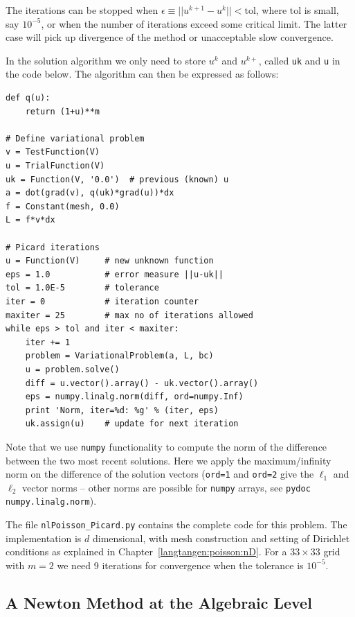 The iterations can be stopped when $\epsilon\equiv ||u^{k+1}-u^k||
< \mbox{tol}$, where $\mbox{tol}$ is small, say $10^{-5}$, or
when the number of iterations exceed some critical limit. The latter
case will pick up divergence of the method or unacceptable slow
convergence.

In the solution algorithm we only need to store $u^k$ and $u^{k+}$,
called {\fontsize{12pt}{12pt}\texttt{uk}} and {\fontsize{12pt}{12pt}\texttt{u}} in the code below.
The algorithm can then be expressed as follows:
\begin{Verbatim}[fontsize=\fontsize{10pt}{10pt},tabsize=8,baselinestretch=1.05,
fontfamily=tt,xleftmargin=7mm]
def q(u):
    return (1+u)**m

# Define variational problem
v = TestFunction(V)
u = TrialFunction(V)
uk = Function(V, '0.0')  # previous (known) u
a = dot(grad(v), q(uk)*grad(u))*dx
f = Constant(mesh, 0.0)
L = f*v*dx

# Picard iterations
u = Function(V)     # new unknown function
eps = 1.0           # error measure ||u-uk||
tol = 1.0E-5        # tolerance
iter = 0            # iteration counter
maxiter = 25        # max no of iterations allowed
while eps > tol and iter < maxiter:
    iter += 1
    problem = VariationalProblem(a, L, bc)
    u = problem.solve()
    diff = u.vector().array() - uk.vector().array()
    eps = numpy.linalg.norm(diff, ord=numpy.Inf)
    print 'Norm, iter=%d: %g' % (iter, eps)
    uk.assign(u)    # update for next iteration
\end{Verbatim}
\noindent
Note that we use {\fontsize{12pt}{12pt}\texttt{numpy}} functionality to compute the norm of
the difference between the two most recent solutions. Here we apply
the maximum/infinity norm on the difference of the solution vectors
({\fontsize{12pt}{12pt}\texttt{ord=1}} and {\fontsize{12pt}{12pt}\texttt{ord=2}} give the $\ell_1$ and $\ell_2$ vector
norms -- other norms are possible for {\fontsize{12pt}{12pt}\texttt{numpy}} arrays,
see {\fontsize{12pt}{12pt}\texttt{pydoc numpy.linalg.norm}}).

The file {\fontsize{12pt}{12pt}\verb!nlPoisson_Picard.py!} contains the complete code for
this problem. The implementation is $d$ dimensional, with mesh
construction and setting of Dirichlet conditions as explained in
Chapter~\ref{langtangen:poisson:nD}.
For a $33\times 33$ grid with $m=2$ we need 9 iterations for convergence
when the tolerance is $10^{-5}$.

\subsection{A Newton Method at the Algebraic Level}
\label{langtangen:nonlinear:Newton:algebraic}

